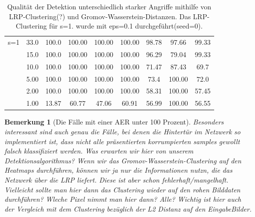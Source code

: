 \documentclass[11pt,a4paper]{article}
\newtheorem{remark}[theorem]{Bemerkung}
\numberwithin{equation}{section}
\begin{document}
\begin{table}[ht]
\begin{center}
{\begin{tabular}{|l|c|c|ccc|ccc|}
								
				s=1 			& 33.0 			& 100.0 	& 100.00& 100.00	& 100.00& 98.78	& 97.66	& 99.33	 \\ 
								& 15.0			& 100.0		& 100.00& 100.00	& 100.00& 96.29	& 79.04	& 99.33	 \\
								& 10.0			& 100.0		& 100.00& 100.00	& 100.00& 71.47	& 87.43 & 69.7 	 \\
								& 5.00			& 100.0		& 100.00& 100.00	& 100.00& 73.4	& 100.00& 72.0	\\
								& 2.00			& 100.0		& 100.00& 100.00	& 100.00& 58.31 & 100.00& 57.45		\\
								& 1.00			& 13.87		& 60.77 & 47.06		& 60.91	& 56.99	& 100.00& 56.55 \\ \hline
			\end{tabular}}
			\caption[Vergleich von Angriffen und Verteidigungen für SPA]{Qualität der Detektion unterschiedlich starker Angriffe mithilfe von LRP-Clustering(?) und Gromov-Wasserstein-Distanzen. Das LRP-Clustering für s=1. wurde mit eps=0.1 durchgeführt(seed=0).}
			\label{tab:SPA_def_inv3_gwclustering}	
		\end{center}
	\end{table}
	\begin{remark}[Die Fälle mit einer AER unter 100 Prozent]
		Besonders interessant sind auch genau die Fälle, bei denen die Hintertür im Netzwerk so implementiert ist, dass nicht alle präsentierten korrumpierten samples gewollt falsch klassifiziert werden. Was erwarten wir hier von unserem Detektionsalgorithmus? Wenn wir das Gromov-Wasserstein-Clustering auf den Heatmaps durchführen, können wir ja nur die Informationen nutzn, die das Netzwerk über die LRP liefert. Diese ist aber schon fehlerhaft/mangelhaft. Vielleicht sollte man hier dann das Clustering wieder auf den rohen Bilddaten durchführen?  Wleche Pixel nimmt man hier dann? Alle? Wichtig ist hier auch der Vergleich mit dem Clustering bezüglich der L2 Distanz auf den EingabeBilder.
	\end{remark}
	
\end{document}
